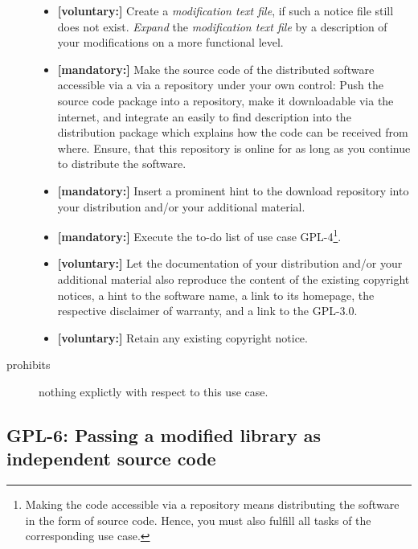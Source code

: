 \begin{description}
\begin{itemize}
  \item \textbf{[voluntary:]} Create a \emph{modification text file}, if such a
  notice file still does not exist. \emph{Expand} the \emph{modification text
  file} by a description of your modifications on a more functional level.
  
  \item \textbf{[mandatory:]} Make the source code of the distributed software
  accessible via a via a repository under your own control: Push the source code
  package into a repository, make it downloadable via the internet, and
  integrate an easily to find description into the distribution package which
  explains how the code can be received from where. Ensure, that this repository
  is online for as long as you continue to distribute the software.
  
  \item \textbf{[mandatory:]} Insert a prominent hint to the download repository
  into your distribution and/or your additional material.
  
  \item \textbf{[mandatory:]} Execute the to-do list of use case GPL-4\footnote{
  Making the code accessible via a repository means distributing the software in
  the form of source code. Hence, you must also fulfill all tasks of the
  corresponding use case.}.
    
  \item \textbf{[voluntary:]} Let the documentation of your distribution and/or
  your additional material also reproduce the content of the existing
  copyright notices, a hint to the software name, a link to its homepage,
  the respective disclaimer of warranty, and a link to the GPL-3.0.
  
  \item \textbf{[voluntary:]} Retain any existing copyright notice. 


\end{itemize}

\item[prohibits] nothing explictly with respect to this use case.

\end{description}

\subsection{GPL-6: Passing a modified library as independent source code}
\label{OSUC-08-GPL}


